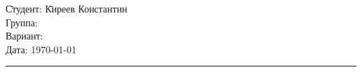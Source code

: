 \begin{tabbing}
	\hspace{11cm} \= Студент: \= Киреев Константин \\
	\> Группа:  \\
	\> Вариант:  \\
	\> Дата: \> \today
\end{tabbing}
\hrule
\vspace{1cm}